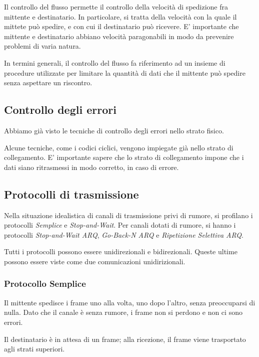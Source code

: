         Il controllo del flusso permette il controllo della velocità di spedizione fra mittente e destinatario. In particolare, si tratta della velocità con la quale il mittete può spedire, e con cui il destinatario può ricevere. E' importante che mittente e destinatario abbiano velocità paragonabili in modo da prevenire problemi di varia natura.
        
        In termini generali, il controllo del flusso fa riferimento ad un insieme di procedure utilizzate per limitare la quantità di dati che il mittente può spedire senza aspettare un riscontro.
        
    \subsection{Controllo degli errori}
    
        Abbiamo già visto le tecniche di controllo degli errori nello strato fisico. 
        
        Alcune tecniche, come i codici ciclici, vengono impiegate già nello strato di collegamento. E' importante sapere che lo strato di collegamento impone che i dati siano ritrasmessi in modo corretto, in caso di errore.
        
    \subsection{Protocolli di trasmissione}
    
        Nella situazione idealistica di canali di trasmissione privi di rumore, si profilano i protocolli \textit{Semplice} e \textit{Stop-and-Wait}. Per canali dotati di rumore, si hanno i protocolli \textit{Stop-and-Wait ARQ}, \textit{Go-Back-N ARQ} e \textit{Ripetizione Selettiva ARQ}.
        
        Tutti i protocolli possono essere unidirezionali e bidirezionali. Queste ultime possono essere viste come due comunicazioni unidirizionali.
        
        \subsubsection{Protocollo Semplice}
        
            Il mittente spedisce i frame uno alla volta, uno dopo l'altro, senza preoccuparsi di nulla. Dato che il canale è senza rumore, i frame non si perdono e non ci sono errori.
            
            Il destinatario è in attesa di un frame; alla ricezione, il frame viene trasportato agli strati superiori.
                    
